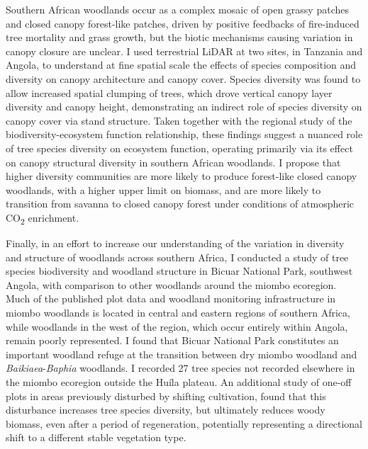 Southern African woodlands occur as a complex mosaic of open grassy patches and closed canopy forest-like patches, driven by positive feedbacks of fire-induced tree mortality and grass growth, but the biotic mechanisms causing variation in canopy closure are unclear. I used terrestrial LiDAR at two sites, in Tanzania and Angola, to understand at fine spatial scale the effects of species composition and diversity on canopy architecture and canopy cover. Species diversity was found to allow increased spatial clumping of trees, which drove vertical canopy layer diversity and canopy height, demonstrating an indirect role of species diversity on canopy cover via stand structure. Taken together with the regional study of the biodiversity-ecosystem function relationship, these findings suggest a nuanced role of tree species diversity on ecosystem function, operating primarily via its effect on canopy structural diversity in southern African woodlands. I propose that higher diversity communities are more likely to produce forest-like closed canopy woodlands, with a higher upper limit on biomass, and are more likely to transition from savanna to closed canopy forest under conditions of atmospheric CO\textsubscript{2} enrichment.

Finally, in an effort to increase our understanding of the variation in diversity and structure of woodlands across southern Africa, I conducted a study of tree species biodiversity and woodland structure in Bicuar National Park, southwest Angola, with comparison to other woodlands around the miombo ecoregion. Much of the published plot data and woodland monitoring infrastructure in miombo woodlands is located in central and eastern regions of southern Africa, while woodlands in the west of the region, which occur entirely within Angola, remain poorly represented. I found that Bicuar National Park constitutes an important woodland refuge at the transition between dry miombo woodland and \textit{Baikiaea}-\textit{Baphia} woodlands. I recorded 27 tree species not recorded elsewhere in the miombo ecoregion outside the Hu\'{i}la plateau. An additional study of one-off plots in areas previously disturbed by shifting cultivation, found that this disturbance increases tree species diversity, but ultimately reduces woody biomass, even after a period of regeneration, potentially representing a directional shift to a different stable vegetation type.

